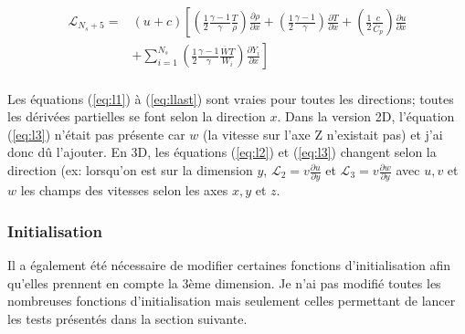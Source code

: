 \begin{equation}\label{eq:llast}
  \begin{split}
    \mathcal{L}_{N_s+5}=&(u+c)\left[ \left( \frac{1}{2} \frac{\gamma -1}{\gamma} \frac{T}{\rho} \right) \frac{\partial \rho}{\partial x} + \left( \frac{1}{2} \frac{\gamma -1}{\gamma} \right) \frac{\partial T}{\partial x}  +  \left( \frac{1}{2} \frac{c}{\overline{C}_p}  \right) \frac{\partial u}{\partial x} \right.\\
      &\left. + \sum_{i=1}^{N_s} \left(  \frac{1}{2} \frac{\gamma -1}{\gamma} \frac{\overline{W}T}{W_i} \right) \frac{\partial Y_i}{\partial x}   \right]
  \end{split}
\end{equation}


\paragraph{}Les équations (\ref{eq:l1}) à (\ref{eq:llast}) sont vraies pour toutes les directions; toutes les dérivées partielles se font selon la direction $x$. Dans la version 2D, l'équation (\ref{eq:l3}) n'était pas présente car $w$ (la vitesse sur l'axe Z n'existait pas) et j'ai donc dû l'ajouter. En 3D, les équations (\ref{eq:l2}) et (\ref{eq:l3}) changent selon la direction (ex: lorsqu'on est sur la dimension $y$, $\mathcal{L}_2 = v \frac{\partial u}{\partial y}$ et $\mathcal{L}_3 = v \frac{\partial w}{\partial y}$ avec $u,v$ et $w$ les champs des vitesses selon les axes $x,y$ et $z$.

\subsubsection{Initialisation}Il a également été nécessaire de modifier certaines fonctions d'initialisation afin qu'elles prennent en compte la 3ème dimension. Je n'ai pas modifié toutes les nombreuses fonctions d'initialisation mais seulement celles permettant de lancer les tests présentés dans la section suivante.





